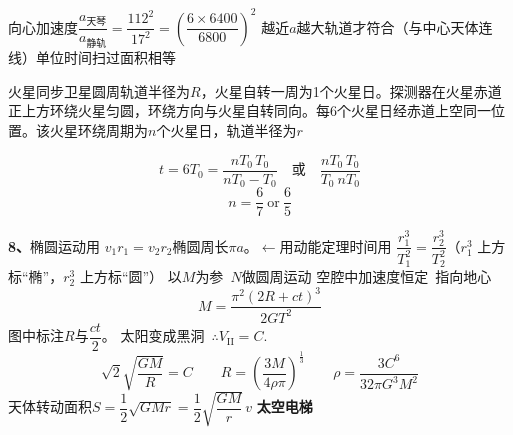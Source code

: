 向心加速度\quad $\dfrac{a_{\text{天琴}}}{a_{\text{静轨}}}=\dfrac{112^2}{17^2}=\left(\dfrac{6\times6400}{6800}\right)^2$ %
越近$a$越大\quad {}轨道才符合（与中心天体连线）单位时间扫过面积相等 %
\begin{problem}
火星同步卫星圆周轨道半径为$R$，火星自转一周为1个火星日。探测器在火星赤道正上方环绕火星匀圆，环绕方向与火星自转同向。每6个火星日经赤道上空同一位置。该火星环绕周期为$n$个火星日，轨道半径为$r$
\begin{solution}
\[
t=6T_0=\frac{nT_0\,T_0}{nT_0-T_0}\quad\text{或}\quad\frac{nT_0\,T_0}{T_0\ nT_0}
\]
\[
n=\frac{6}{7}\ \text{or}\ \frac{6}{5}
\]
\end{solution}
\end{problem}
\textbf{8、}椭圆运动用 $v_1r_1=v_2r_2$\quad 椭圆周长$\pi a$。$\leftarrow$用动能定理\quad 时间用 $\dfrac{r_1^3}{T_1^2}=\dfrac{r_2^3}{T_2^2}$（$r_1^3$ 上方标“椭”，$r_2^3$ 上方标“圆”） %
以$M$为参\ $N$做圆周运动 %
空腔中加速度恒定\ 指向地心
\[
M=\frac{\pi^2(2R+ct)^3}{2GT^2}
\]
图中标注$R$与$\dfrac{ct}{2}$。
太阳变成黑洞\ $\therefore V_{\mathrm{II}}=C$.
\[
\sqrt2\sqrt{\frac{GM}{R}}=C\qquad R=\left(\frac{3M}{4\rho\pi}\right)^{\frac13}\qquad\rho=\frac{3C^6}{32\pi G^3M^2}
\] %
天体转动面积\quad $S=\dfrac12\sqrt{GMr}=\dfrac12\sqrt{\dfrac{GM}{r}}\,v$%
\textbf{太空电梯}

